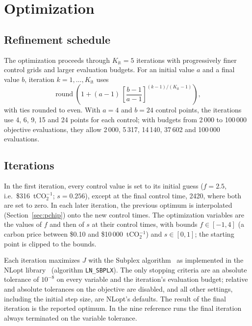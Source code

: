 \documentclass[11pt]{article}
\begin{document}
\section{Optimization}
\label{sec:optimization}

\subsection{Refinement schedule}

The optimization proceeds through $K_{\mathrm{it}} = 5$ iterations with
progressively finer control grids and larger evaluation budgets. For an
initial value $a$ and a final value $b$, iteration $k = 1,\dots,K_{\mathrm{it}}$
uses
\begin{equation}
  \operatorname{round}\!\left(1 + (a-1)\,\left[\frac{b-1}{a-1}\right]^{(k-1)/(K_{\mathrm{it}}-1)}\right),
\end{equation}
with ties rounded to even. With $a = 4$ and $b = 24$ control points, the
iterations use 4, 6, 9, 15 and 24 points for each control; with budgets from
2\,000 to 100\,000 objective evaluations, they allow 2\,000, 5\,317, 14\,140,
37\,602 and 100\,000 evaluations.

\subsection{Iterations}

In the first iteration, every control value is set to its initial guess
($f = 2.5$, i.e.\ \$316~tCO$_2^{-1}$; $s = 0.256$), except at the final control
time, 2420, where both are set to zero. In each later iteration, the previous
optimum is interpolated (Section~\ref{sec:pchip}) onto the new control times.
The optimization variables are the values of $f$ and then of $s$ at their
control times, with bounds $f\in[-1, 4]$ (a carbon price between \$0.10 and
\$10\,000~tCO$_2^{-1}$) and $s\in[0, 1]$; the starting point is clipped to the
bounds.

Each iteration maximizes $J$ with the Subplex algorithm~\cite{Rowan1990} as
implemented in the NLopt library~\cite{NLopt} (algorithm \texttt{LN\_SBPLX}).
The only stopping
criteria are an absolute tolerance of $10^{-8}$ on every variable and the
iteration's evaluation budget; relative and absolute tolerances on the
objective are disabled, and all other settings, including the initial step
size, are NLopt's defaults. The result of the final iteration is the reported
optimum. In the nine reference runs the final iteration always terminated on
the variable tolerance.
\end{document}
